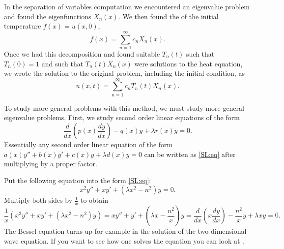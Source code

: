 In the separation of variables computation
we encountered an eigenvalue problem and found the
eigenfunctions
$X_n(x)$.  We then found the \emph{} of
the initial
temperature $f(x) = u(x,0)$,
\begin{equation*}
f(x) = \sum_{n=1}^\infty c_n X_n(x) .
\end{equation*}
Once we had this decomposition
and found suitable $T_n(t)$ such that $T_n(0) = 1$
and such that $T_n(t)X_n(x)$ were solutions to the heat equation,
we wrote the solution to the original problem, including the initial
condition, as
\begin{equation*}
u(x,t) = \sum_{n=1}^\infty c_n T_n(t) X_n(x) .
\end{equation*}

\medskip

To study more general problems with this method, we must study
more general eigenvalue problems.
First, we study 
second order linear equations of the form
\begin{equation} \label{SL:eq}
\frac{d}{dx} \left( p(x) \frac{dy}{dx} \right)
- q(x) y + \lambda r(x) y = 0 .
\end{equation}
Essentially
any second order linear equation
of the form $a(x) y'' + b(x) y' + c(x) y + \lambda d(x) y = 0$
can be written as \eqref{SL:eq}
after multiplying by a proper factor.

\begin{example}[Bessel]
Put the following equation into the form \eqref{SL:eq}:
\begin{equation*}
x^2 y'' + xy' + \left(\lambda x^2 - n^2\right)y = 0 .
\end{equation*}
Multiply both sides by $\frac{1}{x}$ to obtain
\begin{equation*}
\frac{1}{x} \left( x^2 y'' + xy' + \left(\lambda x^2 - n^2\right)y \right)
=
x y'' + y' + \left(\lambda x - \frac{n^2}{x}\right)y 
=
\frac{d}{dx} \left( x \frac{dy}{dx} \right)
- \frac{n^2}{x} y + \lambda x y  = 0.
\end{equation*}
The Bessel equation turns up for example in the solution of
the two-dimensional wave equation.
If you want to see how one solves the equation
you can look at .
\end{example}

